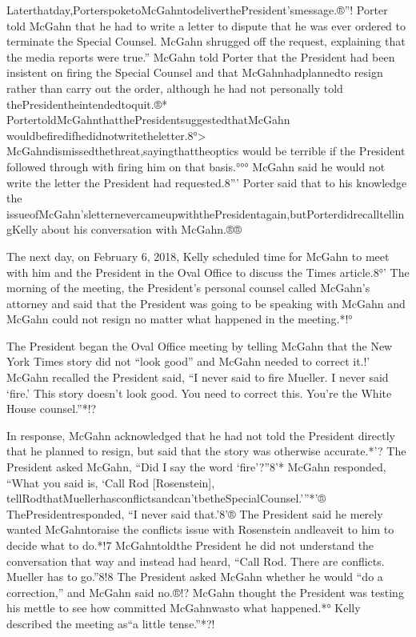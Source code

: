 Laterthatday,PorterspoketoMcGahntodeliverthePresident'smessage.®”! Porter told McGahn that he had to write a letter to dispute that he was ever ordered to terminate the Special Counsel. McGahn shrugged off the request, explaining that the media reports were true.” McGahn told Porter that the President had been insistent on firing the Special Counsel and that McGahnhadplannedto resign rather than carry out the order, although he had not personally told thePresidentheintendedtoquit.®* PortertoldMcGahnthatthePresidentsuggestedthatMcGahn wouldbefiredifhedidnotwritetheletter.8°> McGahndismissedthethreat,sayingthattheoptics would be terrible if the President followed through with firing him on that basis.°°° McGahn said he would not write the letter the President had requested.8”' Porter said that to his knowledge the
issueofMcGahn'sletternevercameupwiththePresidentagain,butPorterdidrecalltellingKelly about his conversation with McGahn.®®

The next day, on February 6, 2018, Kelly scheduled time for McGahn to meet with him and the President in the Oval Office to discuss the Times article.8°' The morning of the meeting, the President's personal counsel called McGahn's attorney and said that the President was going to be speaking with McGahn and McGahn could not resign no matter what happened in the meeting.*!°

The President began the Oval Office meeting by telling McGahn that the New York Times story did not “look good” and McGahn needed to correct it.!' McGahn recalled the President said, “I never said to fire Mueller. I never said ‘fire.' This story doesn't look good. You need to correct this. You're the White House counsel.”*!?

In response, McGahn acknowledged that he had not told the President directly that he planned to resign, but said that the story was otherwise accurate.*'? The President asked McGahn, “Did I say the word ‘fire'?”8'* McGahn responded, “What you said is, ‘Call Rod [Rosenstein], tellRodthatMuellerhasconflictsandcan'tbetheSpecialCounsel.'”*'® ThePresidentresponded, “I never said that.'8'® The President said he merely wanted McGahntoraise the conflicts issue with Rosenstein andleaveit to him to decide what to do.*!7 McGahntoldthe President he did not understand the conversation that way and instead had heard, “Call Rod. There are conflicts. Mueller has to go.”8!8 The President asked McGahn whether he would “do a correction,” and McGahn said no.®!? McGahn thought the President was testing his mettle to see how committed McGahnwasto what happened.*° Kelly described the meeting as“a little tense.”*?!

